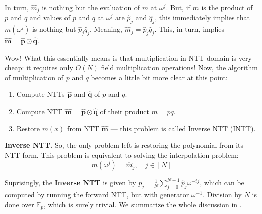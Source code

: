 \documentclass[../lecture-notes.tex]{subfiles}
\begin{document}
In turn, $\hat{m}_j$ is nothing but the evaluation of $m$ at $\omega^j$. But, if $m$ is the product of $p$ and $q$
and values of $p$ and $q$ at $\omega^j$ are $\hat{p}_j$ and $\hat{q}_j$, this immediately implies that 
$m(\omega^j)$ is nothing but $\hat{p}_j\hat{q}_j$. Meaning, $\hat{m}_j = \hat{p}_j\hat{q}_j$. This, in turn,
implies $\hat{\boldsymbol{m}} = \hat{\boldsymbol{p}} \odot \hat{\boldsymbol{q}}$.

Wow! What this essentially means is that multiplication in NTT domain is very cheap:
it requires only $O(N)$ field multiplication operations! Now, the algorithm 
of multiplication of $p$ and $q$ becomes a little bit more clear at this point:
\begin{enumerate}
    \item Compute NTTs $\hat{\boldsymbol{p}}$ and $\hat{\boldsymbol{q}}$ of $p$ and $q$.
    \item Compute NTT $\hat{\boldsymbol{m}} = \hat{\boldsymbol{p}} \odot \hat{\boldsymbol{q}}$ of their product $m = pq$.
    \item Restore $m(x)$ from NTT $\hat{\boldsymbol{m}}$ --- this problem is called Inverse NTT (INTT).
\end{enumerate}

\textcolor{green!60!black}{\textbf{Inverse NTT.}} So, the only problem left is restoring the polynomial from 
its NTT form. This problem is equivalent to solving the interpolation problem:
\begin{equation*}
    m(\omega^j) = \hat{m}_j, \quad j \in [N]
\end{equation*}

Suprisingly, the \textbf{Inverse NTT} is given by $p_j =
\frac{1}{N}\sum_{j=0}^{N-1}\hat{p}_j\omega^{-ij}$, which can be computed by
running the forward NTT, but with generator $\omega^{-1}$. Division by $N$ is
done over $\mathbb{F}_p$, which is surely trivial. We summarize the whole
discussion in .
\end{document}
